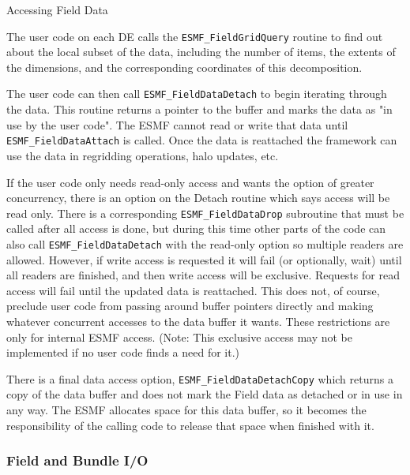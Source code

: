 \begin{description}

\item{Accessing Field Data}

The user code on each DE calls the {\tt ESMF\_FieldGridQuery}
routine to find out about the local subset of the data, including
the number of items, the extents
of the dimensions, and the corresponding coordinates of this
decomposition.

The user code can then call {\tt ESMF\_FieldDataDetach} to
begin iterating through the data.  This routine returns a
pointer to the buffer and marks the data as "in use by
the user code".  The ESMF cannot read or write that
data until {\tt ESMF\_FieldDataAttach} is called.  Once the data
is reattached the framework can use the data in regridding 
operations, halo updates, etc.  

If the user code only needs read-only access and wants
the option of greater concurrency, there is an option on the
Detach routine which says access will be read only.  There is
a corresponding {\tt ESMF\_FieldDataDrop} subroutine that must be called
after all access is done, but during this time other parts of
the code can also call {\tt ESMF\_FieldDataDetach} with the read-only
option so multiple readers are allowed.  However, if write access
is requested it will fail (or optionally, wait) until all readers 
are finished, and
then write access will be exclusive.   Requests for read access
will fail until the updated data is reattached. 
This does not, of course, preclude user code from passing around
buffer pointers directly and making whatever concurrent accesses to the
data buffer it wants.  These restrictions are only for internal
ESMF access.
(Note: This exclusive access may not be implemented if no user
code finds a need for it.)

There is a final data access option, {\tt ESMF\_FieldDataDetachCopy}
which returns a copy of the data buffer and does not mark the
Field data as detached or in use in any way.  The ESMF 
allocates space for this data buffer, so it becomes the
responsibility of the calling code to release that space 
when finished with it.

\end{description}


\subsubsection{Field and Bundle I/O}

